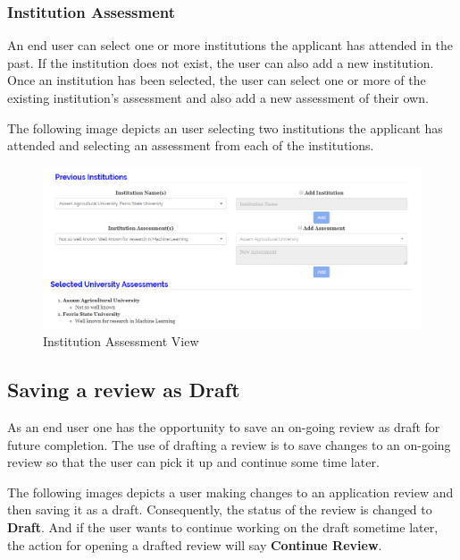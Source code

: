\documentclass[fontsize=12pt,paper=letter,twoside]{scrartcl}
\begin{document}
\subsubsection{Institution Assessment}
An end user can select one or more institutions the applicant has attended in the past. If the institution does not exist, the user can also add a new institution. Once an institution has been selected, the user can select one or more of the existing institution's assessment and also add a new assessment of their own.

\bigskip
\noindent The following image depicts an user selecting two institutions the applicant has attended and selecting an assessment from each of the institutions.

\begin{figure}[!htb]
\begin{center}
\includegraphics[width=.7\textwidth]{images/uni_assessment.png}
\end{center}
\caption{Institution Assessment View}
\label{fig:uni_assessment}
\end{figure}

\clearpage
\newpage
\subsection{Saving a review as Draft}
As an end user one has the opportunity to save an on-going review as draft for future completion. The use of drafting a review is to save changes to an on-going review so that the user can pick it up and continue some time later.

\bigskip
\noindent The following images depicts a user making changes to an application review and then saving it as a draft. Consequently, the status of the review is changed to \textbf{Draft}. And if the user wants to continue working on the draft sometime later, the action for opening a drafted review will say \textbf{Continue Review}.
\end{document}
